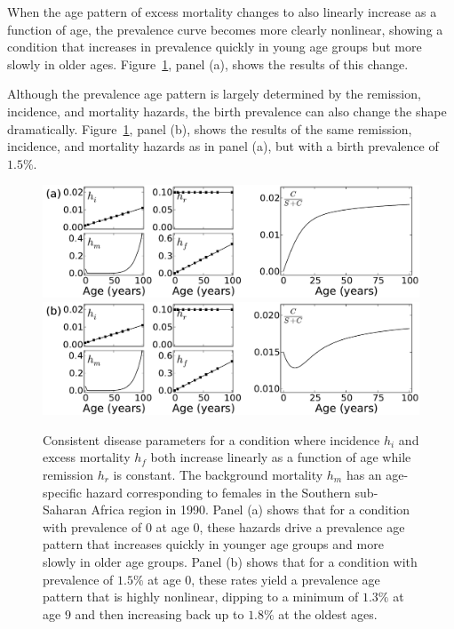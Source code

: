 When the age pattern of excess mortality changes to also linearly
increase as a function of age, the prevalence curve
becomes more clearly nonlinear, showing a condition that increases in
prevalence quickly in young age groups but more slowly in older
ages. Figure~\ref{forward-sim-ex2}, panel (a), shows the results
of this change.

Although the prevalence age pattern is largely determined by the
remission, incidence, and mortality hazards, the birth prevalence can
also change the shape
dramatically. Figure~\ref{forward-sim-ex2}, panel (b),
shows the results of the same remission, incidence, and mortality
hazards as in panel (a), but with a birth prevalence of $1.5\%$.

\begin{figure}[htb]
\begin{center}
\includegraphics[width=\textwidth]{more-excess-mortality.pdf}
\includegraphics[width=\textwidth]{birth-prevalence.pdf}
\caption[Consistent disease parameters for a condition with
  excess mortality $h_f$ increasing linearly as a
  function of age.]{Consistent disease parameters for a condition where incidence
  $h_i$ and excess mortality $h_f$ both increase linearly as a
  function of age while remission $h_r$ is constant. The background
  mortality $h_m$ has an age-specific hazard corresponding to females in
  the Southern sub-Saharan Africa region in 1990. Panel (a) shows that for a condition
  with prevalence of $0$ at age $0$, these hazards drive a prevalence
  age pattern that increases quickly in younger age groups and
  more slowly in older age groups. Panel (b) shows that for a condition with prevalence of
  $1.5\%$ at age $0$, these rates yield a prevalence age pattern that is
  highly nonlinear, dipping to a minimum of $1.3\%$ at age $9$ and then
  increasing back up to $1.8\%$ at the oldest ages.
}
\label{forward-sim-ex2}
\end{center}
\end{figure}


